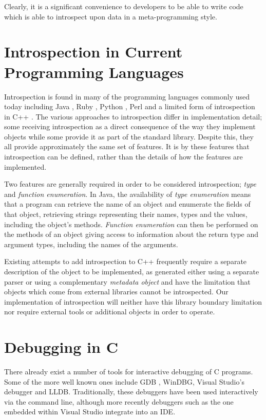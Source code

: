 \documentclass[twocolumn,draft]{article}
\begin{document}
Clearly, it is a significant convenience to developers to be able to write code
which is able to introspect upon data in a meta-programming style.

\section{Introspection in Current Programming Languages}
Introspection is found in many of the programming languages commonly used today
including Java \cite{java-reflect}, Ruby \cite{ruby-introspect},
Python \cite{python-introspect}, Perl \cite{perl-introspect} and a
limited form of introspection in C++ \cite{cpp-rtti}. The various approaches
to introspection differ in implementation detail; some receiving introspection
as a direct consequence of the way they implement objects while some provide it
as part of the standard library. Despite this, they all provide approximately
the same set of features. It is by these features that introspection can be
defined, rather than the details of how the features are implemented.

Two features are generally required in order to be considered introspection;
\emph{type} and \emph{function enumeration}. In Java, the availability of
\emph{type enumeration} means that a program can retrieve the name of an object
and enumerate the fields of that object, retrieving strings representing their
names, types and the values, including the object's methods. \emph{Function
enumeration} can then be performed on the methods of an object giving access to
information about the return type and argument types, including the names of the
arguments.

Existing attempts to add introspection to C++ frequently require a separate
description of the object to be implemented, as generated either using a
separate parser \cite{seal-cpp} or using a complementary \emph{metadata object}
\cite{deBayser:2012:SRT:2415308.2415317} and have the limitation that objects
which come from external libraries cannot be introspected. Our implementation of
introspection will neither have this library boundary limitation nor require
external tools or additional objects in order to operate.

\section{Debugging in C}
There already exist a number of tools for interactive debugging of C programs.
Some of the more well known ones include GDB \cite{gdb}, WinDBG, Visual Studio's
debugger and LLDB. \cite{lldb} Traditionally, these debuggers have been used
interactively via the command line, although more recently debuggers such as the
one embedded within Visual Studio integrate into an IDE.
\end{document}
